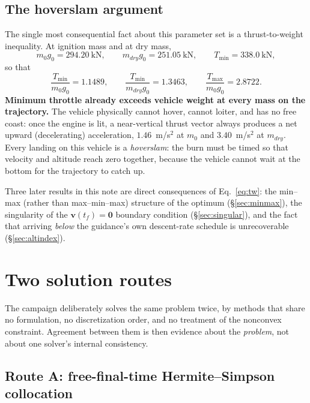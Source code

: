 \documentclass[11pt]{article}
\newcommand{\vvec}{\mathbf{v}}
\newcommand{\Tmin}{T_{\min}}
\newcommand{\Tmax}{T_{\max}}
\begin{document}
\subsection{The hoverslam argument}
\label{sec:hoverslam}

The single most consequential fact about this parameter set is a
thrust-to-weight inequality. At ignition mass and at dry mass,
%
\begin{equation}
m_0 g_0 = 294.20~\text{kN}, \qquad
m_{dry} g_0 = 251.05~\text{kN}, \qquad
\Tmin = 338.0~\text{kN},
\end{equation}
%
so that
%
\begin{equation}
\frac{\Tmin}{m_0 g_0} = 1.1489, \qquad
\frac{\Tmin}{m_{dry} g_0} = 1.3463, \qquad
\frac{\Tmax}{m_0 g_0} = 2.8722 .
\label{eq:tw}
\end{equation}
%
\textbf{Minimum throttle already exceeds vehicle weight at every mass on the
trajectory.} The vehicle physically cannot hover, cannot loiter, and has no
free coast: once the engine is lit, a near-vertical thrust vector always
produces a net upward (decelerating) acceleration, $1.46$~m/s$^2$ at $m_0$
and $3.40$~m/s$^2$ at $m_{dry}$. Every landing on this vehicle is a
\emph{hoverslam}: the burn must be timed so that velocity and altitude reach
zero together, because the vehicle cannot wait at the bottom for the
trajectory to catch up.

Three later results in this note are direct consequences of
Eq.~\eqref{eq:tw}: the min--max (rather than max--min--max) structure of the
optimum (\S\ref{sec:minmax}), the singularity of the $\vvec(t_f) =
\mathbf{0}$ boundary condition (\S\ref{sec:singular}), and the fact that
arriving \emph{below} the guidance's own descent-rate schedule is
unrecoverable (\S\ref{sec:altindex}).

\section{Two solution routes}
\label{sec:routes}

The campaign deliberately solves the same problem twice, by methods that
share no formulation, no discretization order, and no treatment of the
nonconvex constraint. Agreement between them is then evidence about the
\emph{problem}, not about one solver's internal consistency.

\subsection{Route A: free-final-time Hermite--Simpson collocation}
\label{sec:colloc}
\end{document}
